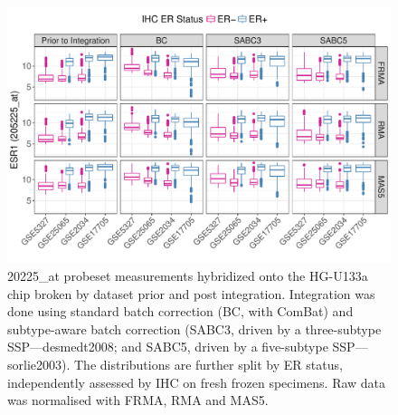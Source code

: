 \documentclass{article}\usepackage[]{graphicx}\usepackage[]{color}
\makeatletter
\def\maxwidth{ %
  \ifdim\Gin@nat@width>\linewidth
    \linewidth
  \else
    \Gin@nat@width
  \fi
}
\newenvironment{knitrout}{}{} %
\makeatother
\begin{document}
\begin{knitrout}
\color{fgcolor}\begin{figure}

{\centering \includegraphics[width=\maxwidth]{figure/er-a-boxplots-1} 

}

\caption[20225\_at probeset measurements hybridized onto the HG-U133a chip broken by dataset prior and post integration]{20225\_at probeset measurements hybridized onto the HG-U133a chip broken by dataset prior and post integration.  Integration was done using standard batch correction (BC, with ComBat) and subtype-aware batch correction (SABC3, driven by a three-subtype SSP---desmedt2008; and SABC5, driven by a five-subtype SSP---sorlie2003).  The distributions are further split by ER status, independently assessed by IHC on fresh frozen specimens.  Raw data was normalised with FRMA, RMA and MAS5.}\label{fig:er-a-boxplots}
\end{figure}


\end{knitrout}
\end{document}
